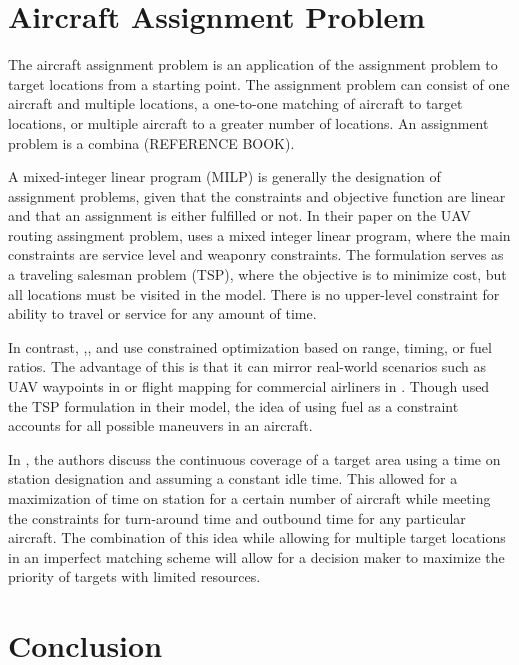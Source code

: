 \section{Aircraft Assignment Problem}
The aircraft assignment problem is an application of the assignment problem to target locations from a starting point. The assignment problem can consist of one aircraft and multiple locations, a one-to-one matching of aircraft to target locations, or multiple aircraft to a greater number of locations. An assignment problem is a combina (REFERENCE BOOK).\par
A mixed-integer linear program (MILP) is generally the designation of assignment problems, given that the constraints and objective function are linear and that an assignment is either fulfilled or not. In their paper on the UAV routing assingment problem, \cite{Shetty} uses a mixed integer linear program, where the main constraints are service level and weaponry constraints. The formulation serves as a traveling salesman problem (TSP), where the objective is to minimize cost, but all locations must be visited in the model. There is no upper-level constraint for ability to travel or service for any amount of time.\par
In contrast, \cite{Alighanbari},\cite{Taylor}, and \cite{Schumacher} use constrained optimization based on range, timing, or fuel ratios. The advantage of this is that it can mirror real-world scenarios such as UAV waypoints in \cite{Alighanbari} or flight mapping for commercial airliners in \cite{Taylor}. Though \cite{Taylor} used the TSP formulation in their model, the idea of using fuel as a constraint accounts for all possible maneuvers in an aircraft.\par
In \cite{OptimizeBreguet}, the authors discuss the continuous coverage of a target area using a time on station designation and assuming a constant idle time. This allowed for a maximization of time on station for a certain number of aircraft while meeting the constraints for turn-around time and outbound time for any particular aircraft. The combination of this idea while allowing for multiple target locations in an imperfect matching scheme will allow for a decision maker to maximize the priority of targets with limited resources.


\section{Conclusion}
